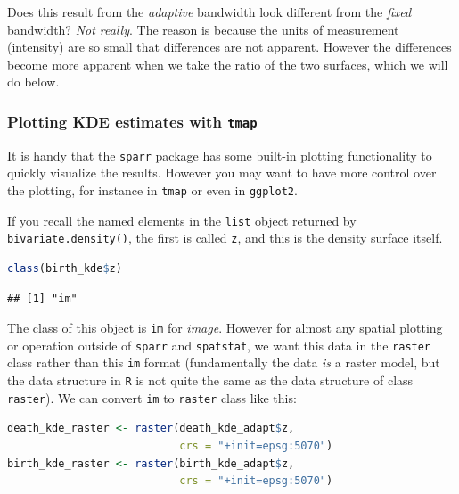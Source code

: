 \documentclass[
]{book}
\newcommand{\passthrough}[1]{#1}
\begin{document}
Does this result from the \emph{adaptive} bandwidth look different from the \emph{fixed} bandwidth? \emph{Not really}. The reason is because the units of measurement (intensity) are so small that differences are not apparent. However the differences become more apparent when we take the ratio of the two surfaces, which we will do below.

\hypertarget{plotting-kde-estimates-with-tmap}{%
\subsubsection{\texorpdfstring{Plotting KDE estimates with \texttt{tmap}}{Plotting KDE estimates with tmap}}\label{plotting-kde-estimates-with-tmap}}

It is handy that the \passthrough{\lstinline!sparr!} package has some built-in plotting functionality to quickly visualize the results. However you may want to have more control over the plotting, for instance in \passthrough{\lstinline!tmap!} or even in \passthrough{\lstinline!ggplot2!}.

If you recall the named elements in the \passthrough{\lstinline!list!} object returned by \passthrough{\lstinline!bivariate.density()!}, the first is called \passthrough{\lstinline!z!}, and this is the density surface itself.

\begin{lstlisting}[language=R]
class(birth_kde$z)
\end{lstlisting}

\begin{lstlisting}
## [1] "im"
\end{lstlisting}

The class of this object is \passthrough{\lstinline!im!} for \emph{image}. However for almost any spatial plotting or operation outside of \passthrough{\lstinline!sparr!} and \passthrough{\lstinline!spatstat!}, we want this data in the \passthrough{\lstinline!raster!} class rather than this \passthrough{\lstinline!im!} format (fundamentally the data \emph{is} a raster model, but the data structure in \passthrough{\lstinline!R!} is not quite the same as the data structure of class \passthrough{\lstinline!raster!}). We can convert \passthrough{\lstinline!im!} to \passthrough{\lstinline!raster!} class like this:

\begin{lstlisting}[language=R]
death_kde_raster <- raster(death_kde_adapt$z,
                           crs = "+init=epsg:5070")
birth_kde_raster <- raster(birth_kde_adapt$z,
                           crs = "+init=epsg:5070")
\end{lstlisting}
\end{document}
